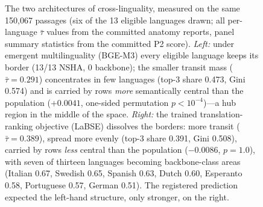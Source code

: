 \documentclass[11pt]{article}
\newcommand{\tmean}{\bar{\tau}}
\begin{document}
\begin{figure}[t]
{}
\caption{The two architectures of cross-linguality, measured on the same
150{,}067 passages (six of the 13 eligible languages drawn; all per-language
$\tmean$ values from the committed anatomy reports, panel summary statistics
from the committed P2 score). \emph{Left:} under emergent multilinguality
(BGE-M3) every eligible language keeps its border (13/13 NSHA, 0 backbone);
the smaller transit mass ($\tmean = 0.291$) concentrates in few languages
(top-3 share 0.473, Gini 0.574) and is carried by rows \emph{more}
semantically central than the population ($+0.0041$, one-sided permutation
$p < 10^{-4}$)---a hub region in the middle of the space. \emph{Right:}
the trained translation-ranking objective (LaBSE) dissolves the borders:
more transit ($\tmean = 0.389$), spread more evenly (top-3 share 0.391,
Gini 0.508), carried by rows \emph{less} central than the population
($-0.0086$, $p = 1.0$), with seven of thirteen languages becoming
backbone-class areas (Italian 0.67, Swedish 0.65, Spanish 0.63, Dutch
0.60, Esperanto 0.58, Portuguese 0.57, German 0.51). The registered
prediction expected the left-hand structure, only stronger, on the right.}
\label{fig:architectures}
\end{figure}
\end{document}
